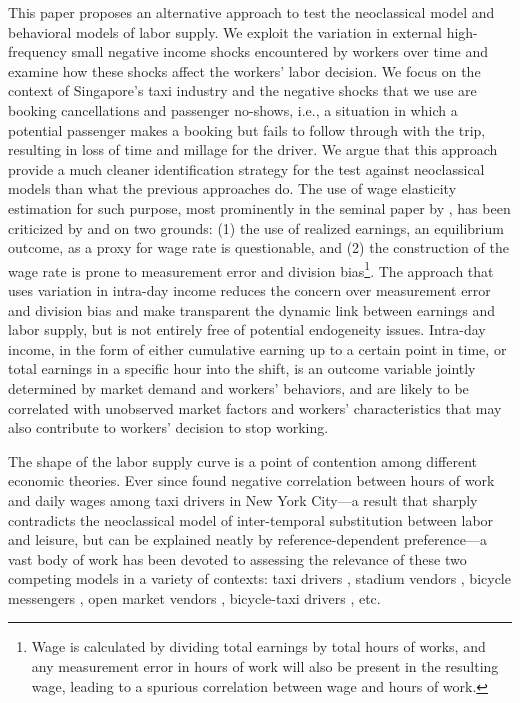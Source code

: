 \documentclass[reviewmode]{AEA}
\begin{document}
This paper proposes an alternative approach to test the neoclassical model and behavioral models of labor supply. We exploit the variation in external high-frequency small negative income shocks encountered by workers over time and examine how these shocks affect the workers' labor decision. We focus on the context of Singapore's taxi industry and the negative shocks that we use are booking cancellations and passenger no-shows, i.e., a situation in which a potential passenger makes a booking but fails to follow through with the trip, resulting in loss of time and millage for the driver. 
We argue that this approach provide a much cleaner identification strategy for the test against neoclassical models than what the previous approaches do. The use of wage elasticity estimation for such purpose, most prominently in the seminal paper by \citet{camerer1997labor}, has been criticized by \citet{oettinger1999empirical} and \citet{farber2005tomorrow} on two grounds: (1) the use of realized earnings, an equilibrium outcome, as a proxy for wage rate is questionable, and (2) the construction of the wage rate is prone to measurement error and division bias\footnote{Wage is calculated by dividing total earnings by total hours of works, and any measurement error in hours of work will also be present in the resulting wage, leading to a spurious correlation between wage and hours of work.}. The approach that uses variation in intra-day income reduces the concern over measurement error and division bias and make transparent the dynamic link between earnings and labor supply, but is not entirely free of potential endogeneity issues. Intra-day income, in the form of either cumulative earning up to a certain point in time, or total earnings in a specific hour into the shift, is an outcome variable jointly determined by market demand and workers' behaviors, and are likely to be correlated with unobserved market factors and workers' characteristics that may also contribute to workers' decision to stop working.



The shape of the labor supply curve is a point of contention among different economic theories. Ever since \citet{camerer1997labor} found negative correlation between hours of work and daily wages among taxi drivers in New York City---a result that sharply contradicts the neoclassical model of inter-temporal substitution between labor and leisure, but can be explained neatly by reference-dependent preference---a vast body of work has been devoted to assessing the relevance of these two competing models in a variety of contexts: taxi drivers \citep{farber2005tomorrow,farber2008reference,farber2015you,crawford2011new,agarwal2015singaporean,martin2017quit,thakral2018daily}, stadium vendors \citep{oettinger1999empirical}, bicycle messengers \citep{fehr2007do}, open market vendors \citep{andersen2014toward}, bicycle-taxi drivers \citep{dupas2018daily}, etc. 
\end{document}
